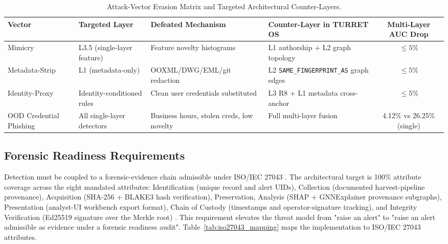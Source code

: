 \begin{table}[t!]
\caption{Attack-Vector Evasion Matrix and Targeted Architectural Counter-Layers.}
\label{tab:attack_evasion_matrix}
\centering
\footnotesize
\renewcommand{\arraystretch}{1.25}
\setlength{\tabcolsep}{6pt}
\begin{tabularx}{\textwidth}{l X X X c}
\toprule
\textbf{Vector} & \textbf{Targeted Layer} & \textbf{Defeated Mechanism} & \textbf{Counter-Layer in TURRET OS} & \textbf{Multi-Layer AUC Drop} \\
\midrule
Mimicry & L3.5 (single-layer feature) & Feature novelty histograms & L1 authorship + L2 graph topology & $\le 5\%$ \\
Metadata-Strip & L1 (metadata-only) & OOXML/DWG/EML/git redaction & L2 \texttt{SAME\_\allowbreak FINGERPRINT\_\allowbreak AS} graph edges & $\le 5\%$ \\
Identity-Proxy & Identity-conditioned rules & Clean user credentials substituted & L3 R8 + L1 metadata cross-anchor & $\le 5\%$ \\
OOD Credential Phishing & All single-layer detectors & Business hours, stolen creds, low novelty & Full multi-layer fusion & 4.12\% vs 26.25\% (single) \\
\bottomrule
\end{tabularx}
\end{table}

\subsection{Forensic Readiness Requirements}

Detection must be coupled to a forensic-evidence chain admissible under ISO/IEC 27043 \citep{shoderu2025dfrsaas, shoderu2026dfrconference}. The architectural target is 100\% attribute coverage across the eight mandated attributes: Identification (unique record and alert UIDs), Collection (documented harvest-pipeline provenance), Acquisition (SHA-256 + BLAKE3 hash verification), Preservation, Analysis (SHAP + GNNExplainer provenance subgraphs), Presentation (analyst-UI workbench export format), Chain of Custody (timestamps and operator-signature tracking), and Integrity Verification (Ed25519 signature over the Merkle root) \citep{shoderu2025dfrsaas}. This requirement elevates the threat model from "raise an alert" to "raise an alert admissible as evidence under a forensic readiness audit". Table~\ref{tab:iso27043_mapping} maps the implementation to ISO/IEC 27043 attributes.

